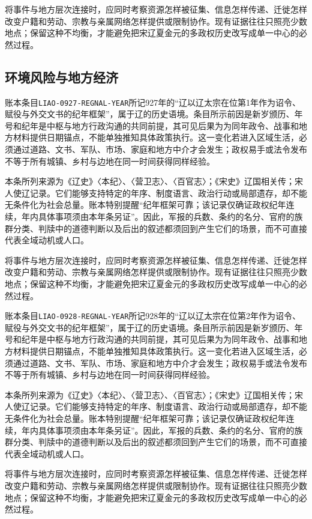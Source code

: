 将事件与地方层次连接时，应同时考察资源怎样被征集、信息怎样传递、迁徙怎样改变户籍和劳动、宗教与亲属网络怎样提供或限制协作。现有证据往往只照亮少数地点；保留这种不均衡，才能避免把宋辽夏金元的多政权历史改写成单一中心的必然过程。

\subsection{环境风险与地方经济}

账本条目\texttt{LIAO-0927-REGNAL-YEAR}所记927年的“辽以辽太宗在位第1年作为诏令、赋役与外交文书的纪年框架”，属于辽的历史语境。条目所示前因是新岁颁历、年号和纪年是中枢与地方行政沟通的共同前提，其可见后果为为同年政令、战事和地方材料提供日期锚点，不能单独推知具体政策执行。这一变化若进入区域生活，必须通过道路、文书、军队、市场、家庭和地方中介才会发生；政权易手或法令发布不等于所有城镇、乡村与边地在同一时间获得同样经验。

本条所列来源为《辽史》〈本纪〉、〈营卫志〉、〈百官志〉；《宋史》辽国相关传；宋人使辽记录。它们能够支持特定的年序、制度语言、政治行动或局部遗存，却不能无条件化为社会总量。账本特别提醒“纪年框架可靠；该记录仅确证政权纪年连续，年内具体事项须由本年条另证”。因此，军报的兵数、条约的名分、官府的族群分类、判牍中的道德判断以及后出的叙述都须回到产生它们的场景，而不可直接代表全域动机或人口。

将事件与地方层次连接时，应同时考察资源怎样被征集、信息怎样传递、迁徙怎样改变户籍和劳动、宗教与亲属网络怎样提供或限制协作。现有证据往往只照亮少数地点；保留这种不均衡，才能避免把宋辽夏金元的多政权历史改写成单一中心的必然过程。

账本条目\texttt{LIAO-0928-REGNAL-YEAR}所记928年的“辽以辽太宗在位第2年作为诏令、赋役与外交文书的纪年框架”，属于辽的历史语境。条目所示前因是新岁颁历、年号和纪年是中枢与地方行政沟通的共同前提，其可见后果为为同年政令、战事和地方材料提供日期锚点，不能单独推知具体政策执行。这一变化若进入区域生活，必须通过道路、文书、军队、市场、家庭和地方中介才会发生；政权易手或法令发布不等于所有城镇、乡村与边地在同一时间获得同样经验。

本条所列来源为《辽史》〈本纪〉、〈营卫志〉、〈百官志〉；《宋史》辽国相关传；宋人使辽记录。它们能够支持特定的年序、制度语言、政治行动或局部遗存，却不能无条件化为社会总量。账本特别提醒“纪年框架可靠；该记录仅确证政权纪年连续，年内具体事项须由本年条另证”。因此，军报的兵数、条约的名分、官府的族群分类、判牍中的道德判断以及后出的叙述都须回到产生它们的场景，而不可直接代表全域动机或人口。

将事件与地方层次连接时，应同时考察资源怎样被征集、信息怎样传递、迁徙怎样改变户籍和劳动、宗教与亲属网络怎样提供或限制协作。现有证据往往只照亮少数地点；保留这种不均衡，才能避免把宋辽夏金元的多政权历史改写成单一中心的必然过程。

